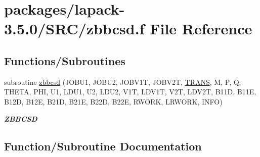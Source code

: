 \hypertarget{zbbcsd_8f}{}\section{packages/lapack-\/3.5.0/\+S\+R\+C/zbbcsd.f File Reference}
\label{zbbcsd_8f}
\subsection*{Functions/\+Subroutines}
\begin{DoxyCompactItemize}
\item 
subroutine \hyperlink{zbbcsd_8f_ab100b320bf854584daf3579ff6d96485}{zbbcsd} (J\+O\+B\+U1, J\+O\+B\+U2, J\+O\+B\+V1\+T, J\+O\+B\+V2\+T, \hyperlink{superlu__enum__consts_8h_a0c4e17b2d5cea33f9991ccc6a6678d62a1f61e3015bfe0f0c2c3fda4c5a0cdf58}{T\+R\+A\+N\+S}, M, P, Q, T\+H\+E\+T\+A, P\+H\+I, U1, L\+D\+U1, U2, L\+D\+U2, V1\+T, L\+D\+V1\+T, V2\+T, L\+D\+V2\+T, B11\+D, B11\+E, B12\+D, B12\+E, B21\+D, B21\+E, B22\+D, B22\+E, R\+W\+O\+R\+K, L\+R\+W\+O\+R\+K, I\+N\+F\+O)
\begin{DoxyCompactList}\small\item\em {\bfseries Z\+B\+B\+C\+S\+D} \end{DoxyCompactList}\end{DoxyCompactItemize}


\subsection{Function/\+Subroutine Documentation}
\hypertarget{zbbcsd_8f_ab100b320bf854584daf3579ff6d96485}{}
